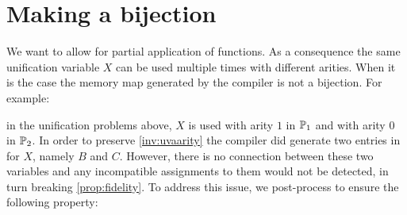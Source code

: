 \section{Making \mapStore a bijection}
\label{sec:invariant1}

We want to allow for partial application of functions.
As a consequence
the same unification variable $X$ can be used multiple times
with different arities.
When it is the case the
memory map \mapStore generated by the compiler is not
a bijection. For example:

% 


in the unification problems \foUnifPb above, $X$ is used with arity $1$ in
$\mathbb{P}_1$ and with arity $0$ in $\mathbb{P}_2$. 
In order to preserve \cref{inv:uvaarity} the compiler
did generate two entries in \mapStore for $X$, namely $B$ and $C$. 
However, there is no connection between these two variables
and any incompatible assignments to them would not be detected,
in turn breaking \cref{prop:fidelity}. 
To address this issue, we post-process \mapStore
to ensure the following property:

